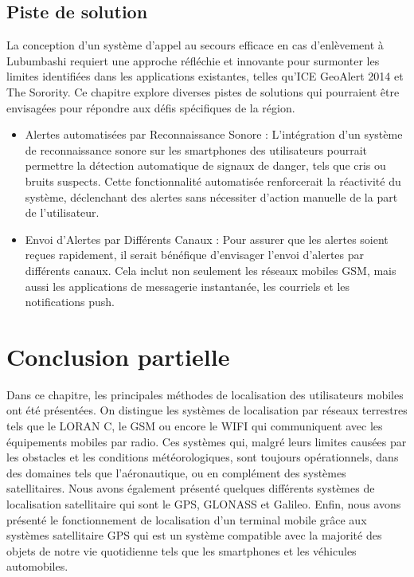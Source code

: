 \subsection{Piste de solution}

La conception d'un système d'appel au secours efficace en cas d'enlèvement à Lubumbashi requiert une approche réfléchie et innovante pour surmonter les limites identifiées dans les applications existantes, telles qu'ICE GeoAlert 2014 et The Sorority. Ce chapitre explore diverses pistes de solutions qui pourraient être envisagées pour répondre aux défis spécifiques de la région.

\begin{itemize}
	\item Alertes automatisées par Reconnaissance Sonore : L'intégration d'un système de reconnaissance sonore sur les smartphones des utilisateurs pourrait permettre la détection automatique de signaux de danger, tels que cris ou bruits suspects. Cette fonctionnalité automatisée renforcerait la réactivité du système, déclenchant des alertes sans nécessiter d'action manuelle de la part de l'utilisateur.
	
	\item Envoi d'Alertes par Différents Canaux : Pour assurer que les alertes soient reçues rapidement, il serait bénéfique d'envisager l'envoi d'alertes par différents canaux. Cela inclut non seulement les réseaux mobiles GSM, mais aussi les applications de messagerie instantanée, les courriels et les notifications push.
\end{itemize}

\section{Conclusion partielle}
Dans ce chapitre, les principales méthodes de localisation des utilisateurs mobiles ont été présentées. On distingue les systèmes de localisation par réseaux terrestres tels que le LORAN C, le GSM ou encore le WIFI qui communiquent avec les équipements mobiles par radio. Ces systèmes qui, malgré leurs limites causées par les obstacles et les conditions météorologiques, sont toujours opérationnels, dans des domaines tels que l’aéronautique, ou en complément des systèmes satellitaires. Nous avons également présenté quelques différents systèmes de localisation satellitaire qui sont le GPS, GLONASS et Galileo. Enfin, nous avons présenté le fonctionnement de localisation d’un terminal mobile grâce aux systèmes satellitaire GPS qui est un système compatible avec la majorité des objets de notre vie quotidienne tels que les smartphones et les véhicules automobiles.
